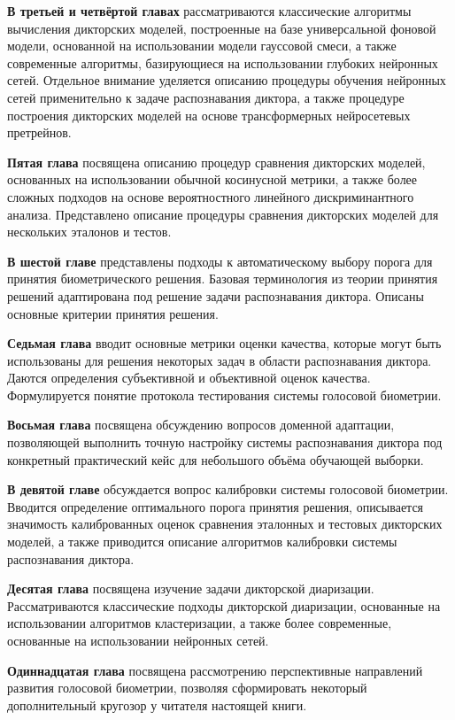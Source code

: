 \documentclass[12pt]{book}
\begin{document}
\textbf{В третьей и четвёртой главах} рассматриваются классические алгоритмы вычисления дикторских моделей, построенные на базе универсальной фоновой модели, основанной на использовании модели гауссовой смеси, а также современные алгоритмы, базирующиеся на использовании глубоких нейронных сетей. Отдельное внимание уделяется описанию процедуры обучения нейронных сетей применительно к задаче распознавания диктора, а также процедуре построения дикторских моделей на основе трансформерных нейросетевых претрейнов.

\textbf{Пятая глава} посвящена описанию процедур сравнения дикторских моделей, основанных на использовании обычной косинусной метрики, а также более сложных подходов на основе вероятностного линейного дискриминантного анализа. Представлено описание процедуры сравнения дикторских моделей для нескольких эталонов и тестов.

\textbf{В шестой главе} представлены подходы к автоматическому выбору порога для принятия биометрического решения. Базовая терминология из теории принятия решений адаптирована под решение задачи распознавания диктора. Описаны основные критерии принятия решения.

\textbf{Седьмая глава} вводит основные метрики оценки качества, которые могут быть использованы для решения некоторых задач в области распознавания диктора. Даются определения субъективной и объективной оценок качества. Формулируется понятие протокола тестирования системы голосовой биометрии.

\textbf{Восьмая глава} посвящена обсуждению вопросов доменной адаптации, позволяющей выполнить точную настройку системы распознавания диктора под конкретный практический кейс для небольшого объёма обучающей выборки.

\textbf{В девятой главе} обсуждается вопрос калибровки системы голосовой биометрии. Вводится определение оптимального порога принятия решения, описывается значимость калиброванных оценок сравнения эталонных и тестовых дикторских моделей, а также приводится описание алгоритмов калибровки системы распознавания диктора.

\textbf{Десятая глава} посвящена изучение задачи дикторской диаризации. Рассматриваются классические подходы дикторской диаризации, основанные на использовании алгоритмов кластеризации, а также более современные, основанные на использовании нейронных сетей.

\textbf{Одиннадцатая глава} посвящена рассмотрению перспективные направлений развития голосовой биометрии, позволяя сформировать некоторый дополнительный кругозор у читателя настоящей книги.
\end{document}
